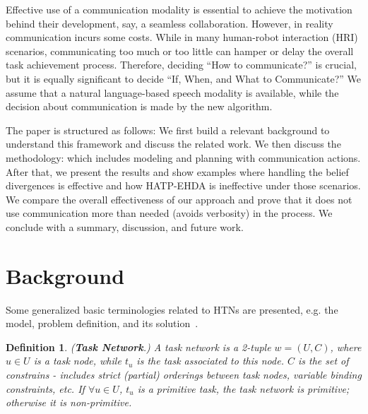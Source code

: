 \documentclass[letterpaper]{article} %
\newtheorem{definition}{Definition}
\begin{document}
Effective use of a communication modality is essential to achieve the motivation behind their development, say, a seamless collaboration. However, in reality communication incurs some costs. 
While in many human-robot interaction (HRI) scenarios, communicating too much or too little can hamper or delay the overall task achievement process. 
Therefore, deciding ``How to communicate?'' is crucial, but it is equally significant to decide ``If, When, and What to Communicate?'' 
We assume that a natural language-based speech modality is available, while 
the decision about communication is made by the new algorithm. 
%

The paper is structured as follows: We first build a relevant background to understand this framework and discuss the related work. We then discuss the methodology: which includes modeling and planning with communication actions. 
After that, we present the results and show examples where handling the belief divergences is effective and how HATP-EHDA is ineffective under those scenarios. We compare the overall effectiveness of our approach and prove that it does not use communication more than needed (avoids verbosity) in the process. We conclude with a summary, discussion, and future work.

\section{Background}

Some generalized basic terminologies related to HTNs are presented, e.g. the model, problem definition, and its solution~\cite{naubooks0014222}.  
\begin{definition} 
(\textbf{Task Network}.) {A task network is a 2-tuple $w=(U,C)$, where $u\in U$ is a task node, while $t_u$ is the task associated to this node. $C$ is the set of constrains - includes strict (partial) orderings between task nodes, variable binding constraints, etc. If $\forall u \in U$, $t_u$ is a primitive task, the task network is primitive; otherwise it is non-primitive.}  
\end{definition}
\end{document}
